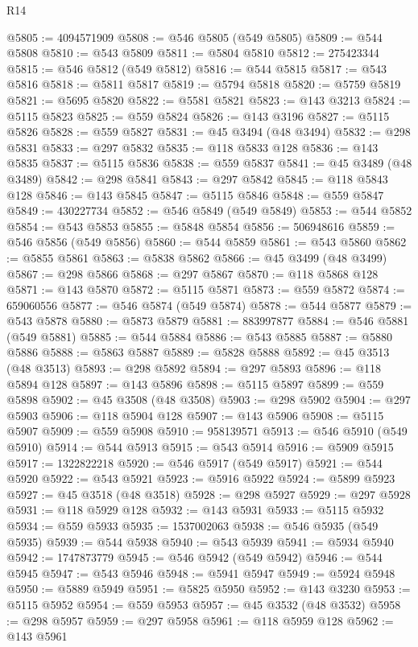 \begin{lexlean}{R14}
\begin{coremodule}
{{{{{{{{{{{{{{{{{{{{{{{{{{{{{{{{{{{{{{{{{{{{{{{{{{{{{{{{{{{{{{{{{{{{{{{{{{{{{{{{{{@5805 := 4094571909
@5808 := @546 @5805 (@549 @5805)
@5809 := @544 @5808
@5810 := @543 @5809
@5811 := @5804 @5810
@5812 := 275423344
@5815 := @546 @5812 (@549 @5812)
@5816 := @544 @5815
@5817 := @543 @5816
@5818 := @5811 @5817
@5819 := @5794 @5818
@5820 := @5759 @5819
@5821 := @5695 @5820
@5822 := @5581 @5821
@5823 := @143 @3213
@5824 := @5115 @5823
@5825 := @559 @5824
@5826 := @143 @3196
@5827 := @5115 @5826
@5828 := @559 @5827
@5831 := @45 @3494 (@48 @3494)
@5832 := @298 @5831
@5833 := @297 @5832
@5835 := @118 @5833 @128
@5836 := @143 @5835
@5837 := @5115 @5836
@5838 := @559 @5837
@5841 := @45 @3489 (@48 @3489)
@5842 := @298 @5841
@5843 := @297 @5842
@5845 := @118 @5843 @128
@5846 := @143 @5845
@5847 := @5115 @5846
@5848 := @559 @5847
@5849 := 430227734
@5852 := @546 @5849 (@549 @5849)
@5853 := @544 @5852
@5854 := @543 @5853
@5855 := @5848 @5854
@5856 := 506948616
@5859 := @546 @5856 (@549 @5856)
@5860 := @544 @5859
@5861 := @543 @5860
@5862 := @5855 @5861
@5863 := @5838 @5862
@5866 := @45 @3499 (@48 @3499)
@5867 := @298 @5866
@5868 := @297 @5867
@5870 := @118 @5868 @128
@5871 := @143 @5870
@5872 := @5115 @5871
@5873 := @559 @5872
@5874 := 659060556
@5877 := @546 @5874 (@549 @5874)
@5878 := @544 @5877
@5879 := @543 @5878
@5880 := @5873 @5879
@5881 := 883997877
@5884 := @546 @5881 (@549 @5881)
@5885 := @544 @5884
@5886 := @543 @5885
@5887 := @5880 @5886
@5888 := @5863 @5887
@5889 := @5828 @5888
@5892 := @45 @3513 (@48 @3513)
@5893 := @298 @5892
@5894 := @297 @5893
@5896 := @118 @5894 @128
@5897 := @143 @5896
@5898 := @5115 @5897
@5899 := @559 @5898
@5902 := @45 @3508 (@48 @3508)
@5903 := @298 @5902
@5904 := @297 @5903
@5906 := @118 @5904 @128
@5907 := @143 @5906
@5908 := @5115 @5907
@5909 := @559 @5908
@5910 := 958139571
@5913 := @546 @5910 (@549 @5910)
@5914 := @544 @5913
@5915 := @543 @5914
@5916 := @5909 @5915
@5917 := 1322822218
@5920 := @546 @5917 (@549 @5917)
@5921 := @544 @5920
@5922 := @543 @5921
@5923 := @5916 @5922
@5924 := @5899 @5923
@5927 := @45 @3518 (@48 @3518)
@5928 := @298 @5927
@5929 := @297 @5928
@5931 := @118 @5929 @128
@5932 := @143 @5931
@5933 := @5115 @5932
@5934 := @559 @5933
@5935 := 1537002063
@5938 := @546 @5935 (@549 @5935)
@5939 := @544 @5938
@5940 := @543 @5939
@5941 := @5934 @5940
@5942 := 1747873779
@5945 := @546 @5942 (@549 @5942)
@5946 := @544 @5945
@5947 := @543 @5946
@5948 := @5941 @5947
@5949 := @5924 @5948
@5950 := @5889 @5949
@5951 := @5825 @5950
@5952 := @143 @3230
@5953 := @5115 @5952
@5954 := @559 @5953
@5957 := @45 @3532 (@48 @3532)
@5958 := @298 @5957
@5959 := @297 @5958
@5961 := @118 @5959 @128
@5962 := @143 @5961
}}}}}}}}}}}}}}}}}}}}}}}}}}}}}}}}}}}}}}}}}}}}}}}}}}}}}}}}}}}}}}}}}}}}}}}}}}}}}}}}}}
\end{coremodule}
\end{lexlean}
